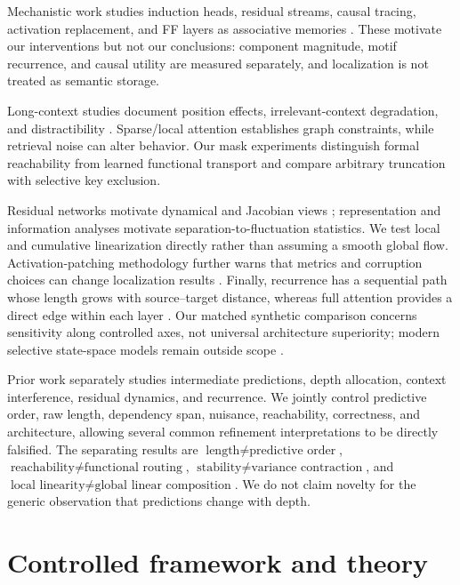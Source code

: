 \documentclass[10pt]{article}
\begin{document}
Mechanistic work studies induction heads, residual streams, causal tracing, activation replacement, and FF layers as associative memories \cite{olsson2022induction,meng2022rome,geva2021ffn}. These motivate our interventions but not our conclusions: component magnitude, motif recurrence, and causal utility are measured separately, and localization is not treated as semantic storage.

Long-context studies document position effects, irrelevant-context degradation, and distractibility \cite{liu2023lost,shi2023distracted}. Sparse/local attention establishes graph constraints, while retrieval noise can alter behavior. Our mask experiments distinguish formal reachability from learned functional transport and compare arbitrary truncation with selective key exclusion.

Residual networks motivate dynamical and Jacobian views \cite{chen2018ode,sander2022resnet}; representation and information analyses motivate separation-to-fluctuation statistics. We test local and cumulative linearization directly rather than assuming a smooth global flow. Activation-patching methodology further warns that metrics and corruption choices can change localization results \cite{zhang2023patching}. Finally, recurrence has a sequential path whose length grows with source--target distance, whereas full attention provides a direct edge within each layer \cite{vaswani2017attention,hochreiter1997lstm,cho2014gru}. Our matched synthetic comparison concerns sensitivity along controlled axes, not universal architecture superiority; modern selective state-space models remain outside scope \cite{gu2023mamba}.

Prior work separately studies intermediate predictions, depth allocation, context interference, residual dynamics, and recurrence. We jointly control predictive order, raw length, dependency span, nuisance, reachability, correctness, and architecture, allowing several common refinement interpretations to be directly falsified. The separating results are $\text{length}\ne\text{predictive order}$, $\text{reachability}\ne\text{functional routing}$, $\text{stability}\ne\text{variance contraction}$, and $\text{local linearity}\ne\text{global linear composition}$. We do not claim novelty for the generic observation that predictions change with depth.

\section{Controlled framework and theory}
\end{document}
